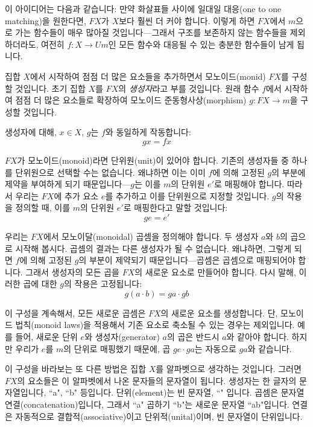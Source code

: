 \documentclass[DaoFP]{subfiles}
\begin{document}
이 아이디어는 다음과 같습니다: 만약 화살표들 사이에 일대일 대응(one to one matching)을 원한다면, $F X$가 $X$보다 훨씬 더 커야 합니다. 이렇게 하면 $F X$에서 $m$으로 가는 함수들이 매우 많아질 것입니다---그래서 구조를 보존하지 않는 함수들을 제외하더라도, 여전히 $f \colon X \to U m$인 모든 함수와 대응될 수 있는 충분한 함수들이 남게 됩니다.

집합 $X$에서 시작하여 점점 더 많은 요소들을 추가하면서 모노이드(monid) $F X$를 구성할 것입니다. 초기 집합 $X$를 $F X$의 \emph{생성자}라고 부를 것입니다. 원래 함수 $f$에서 시작하여 점점 더 많은 요소들로 확장하여 모노이드 준동형사상(morphism) $g \colon F X \to m$을 구성할 것입니다.

생성자에 대해, $x \in X$, $g$는 $f$와 동일하게 작동합니다:
\[ g x = f x \]

$F X$가 모노이드(monoid)라면 단위원(unit)이 있어야 합니다. 기존의 생성자들 중 하나를 단위원으로 선택할 수는 없습니다. 왜냐하면 이는 이미 $f$에 의해 고정된 $g$의 부분에 제약을 부여하게 되기 때문입니다---$g$는 이를 $m$의 단위원 $e'$로 매핑해야 합니다. 따라서 우리는 $F X$에 추가 요소 $e$를 추가하고 이를 단위원으로 지정할 것입니다. $g$의 작용을 정의할 때, 이를 $m$의 단위원 $e'$로 매핑한다고 말할 것입니다:
\[ g e = e' \]

우리는 $F X$에서 모노이달(monoidal) 곱셈을 정의해야 합니다. 두 생성자 $a$와 $b$의 곱으로 시작해 봅시다. 곱셈의 결과는 다른 생성자가 될 수 없습니다. 왜냐하면, 그렇게 되면 $f$에 의해 고정된 $g$의 부분이 제약되기 때문입니다---곱셈은 곱셈으로 매핑되어야 합니다. 그래서 생성자의 모든 곱을 $F X$의 새로운 요소로 만들어야 합니다. 다시 말해, 이러한 곱에 대한 $g$의 작용은 고정됩니다:
\[ g (a \cdot b)  = g a \cdot g b\]

이 구성을 계속해서, 모든 새로운 곱셈은 $F X$의 새로운 요소를 생성합니다. 단, 모노이드 법칙(monoid laws)을 적용해서 기존 요소로 축소될 수 있는 경우는 제외입니다. 예를 들어, 새로운 단위 $e$와 생성자(generator) $a$의 곱은 반드시 $a$와 같아야 합니다. 하지만 우리가 $e$를 $m$의 단위로 매핑했기 때문에, 곱 $g e \cdot g a$는 자동으로 $g a$와 같습니다.

이 구성을 바라보는 또 다른 방법은 집합 \( X \)를 알파벳으로 생각하는 것입니다. 그러면 \( F X \)의 요소들은 이 알파벳에서 나온 문자들의 문자열이 됩니다. 생성자는 한 글자의 문자열입니다, ``a", ``b" 등입니다. 단위(element)는 빈 문자열, ``" 입니다. 곱셈은 문자열 연결(concatenation)입니다, 그래서 ``a" 곱하기 ``b"는 새로운 문자열 ``ab"입니다. 연결은 자동적으로 결합적(associative)이고 단위적(unital)이며, 빈 문자열이 단위입니다.
\end{document}
